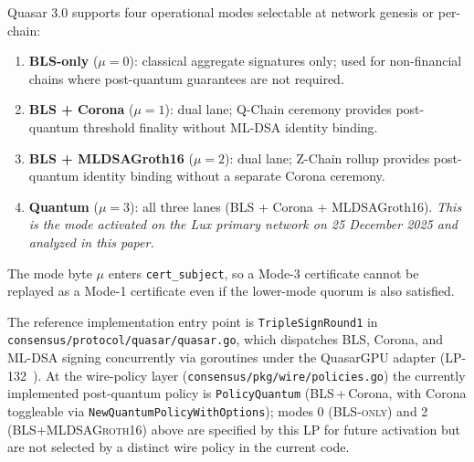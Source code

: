 \begin{definition}
\label{def:modes}
Quasar 3.0 supports four operational modes selectable at network genesis or
per-chain:
\begin{enumerate}[leftmargin=2em]
\item \textbf{BLS-only} ($\mu = 0$): classical aggregate signatures only;
      used for non-financial chains where post-quantum guarantees are not
      required.
\item \textbf{BLS + Corona} ($\mu = 1$): dual lane; Q-Chain ceremony
      provides post-quantum threshold finality without ML-DSA identity
      binding.
\item \textbf{BLS + MLDSAGroth16} ($\mu = 2$): dual lane; Z-Chain rollup
      provides post-quantum identity binding without a separate Corona
      ceremony.
\item \textbf{Quantum} ($\mu = 3$): all three lanes (BLS + Corona +
      MLDSAGroth16). \emph{This is the mode activated on the Lux primary
      network on 25 December 2025 and analyzed in this paper.}
\end{enumerate}
\end{definition}

The mode byte $\mu$ enters \texttt{cert\_subject}, so a Mode-3 certificate
cannot be replayed as a Mode-1 certificate even if the lower-mode quorum
is also satisfied.

The reference implementation entry point is
\texttt{TripleSignRound1} in
\texttt{consensus/protocol/quasar/quasar.go}, which dispatches BLS,
Corona, and ML-DSA signing concurrently via goroutines under the
QuasarGPU adapter (LP-132~\cite{lp132-quasargpu}). At the wire-policy
layer (\texttt{consensus/pkg/wire/policies.go}) the currently
implemented post-quantum policy is \texttt{PolicyQuantum}
(BLS\,+\,Corona, with Corona toggleable via
\texttt{NewQuantumPolicyWithOptions}); modes 0 (\textsc{BLS-only}) and
2 (\textsc{BLS+MLDSAGroth16}) above are specified by this LP for
future activation but are not selected by a distinct wire policy in
the current code.


